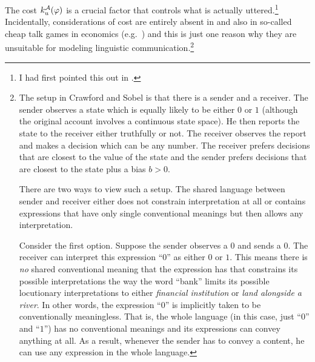 The cost $k^{\cal A}_u(\varphi)$ is a crucial factor that controls what is actually uttered.\footnote{I had first pointed this out in \citet{parikh:diss}.} Incidentally, considerations of cost are entirely absent in \citet{lewis:c} and also in so-called cheap talk games in economics (e.g.\ \citealt{cs:sit,farrell:ctce,farrell:mcctg,fr:ct,kartik:sclc,bb:lb}) and this is just one reason why they are unsuitable for modeling linguistic communication.\footnote{The setup in Crawford and Sobel is that there is a sender and a receiver. The sender observes a state which is equally likely to be either $0$ or $1$ (although the original account involves a continuous state space). He then reports the state to the receiver either truthfully or not. The receiver observes the report and makes a decision which can be any number. The receiver prefers decisions that are closest to the value of the state and the sender prefers decisions that are closest to the state plus a bias $b > 0$.




There are two ways to view such a setup. The shared language between sender and receiver either does not constrain interpretation at all or contains expressions that have only single conventional meanings but then allows any interpretation. 

Consider the first option. Suppose the sender observes a $0$ and sends a $0$. The receiver can interpret this expression ``$0$'' as either $0$ or $1$. This means there is \emph{no} shared conventional meaning that the expression has that constrains its possible interpretations the way the word ``bank'' limits its possible locutionary interpretations to either \emph{financial institution} or \emph{land alongside a river}. In other words, the expression ``$0$'' is implicitly taken to be conventionally meaningless. That is, the whole language (in this case, just ``$0$'' and ``$1$'') has no conventional meanings and its expressions can convey anything at all. As a result, whenever the sender has to convey a content, he can use any expression in the whole language.

}
